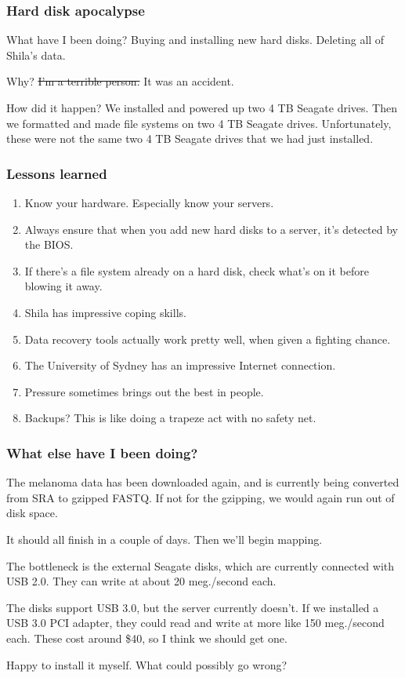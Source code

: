 \documentclass{beamer}
\begin{document}
\begin{frame}
\frametitle{Hard disk apocalypse}
What have I been doing? Buying and installing new hard disks. Deleting all of Shila's data.

Why? \st{I'm a terrible person. }It was an accident.

How did it happen? We installed and powered up two 4 TB Seagate drives. Then we formatted and made file systems on two 4 TB Seagate drives. Unfortunately, these were not the same two 4 TB Seagate drives that we had just installed.
\end{frame}

\begin{frame}
\frametitle{Lessons learned}
\begin{enumerate}
\item Know your hardware. Especially know your servers.
\item Always ensure that when you add new hard disks to a server, it's detected by the BIOS.
\item If there's a file system already on a hard disk, check what's on it before blowing it away.
\item Shila has impressive coping skills.
\item Data recovery tools actually work pretty well, when given a fighting chance.
\item The University of Sydney has an impressive Internet connection.
\item Pressure sometimes brings out the best in people.
\item Backups? This is like doing a trapeze act with no safety net.
\end{enumerate}
\end{frame}

\begin{frame}
\frametitle{What else have I been doing?}
The melanoma data has been downloaded again, and is currently being converted from SRA to
gzipped FASTQ. If not for the gzipping, we would again run out of disk space.

It should all finish in a couple of days. Then we'll begin mapping.

The bottleneck is the external Seagate disks, which are currently connected with USB 2.0. 
They can write at about 20 meg./second each.

The disks support USB 3.0, but the server currently doesn't. If we installed a USB 3.0 PCI 
adapter, they could read and write at more like 150 meg./second each. These cost around 
\$40, so I think we should get one.

Happy to install it myself. What could possibly go wrong?
\end{frame}
\end{document}
